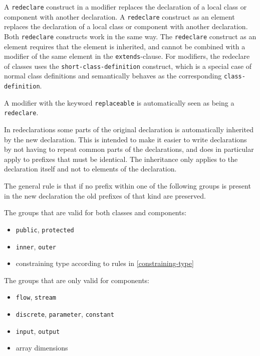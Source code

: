 A \lstinline!redeclare! construct in a modifier replaces the declaration of a local class or component with another declaration.
A \lstinline!redeclare! construct as an element replaces the declaration of a local class or component with another declaration.
Both \lstinline!redeclare! constructs work in the same way.
The \lstinline!redeclare! construct as an element requires that the element is inherited, and cannot be combined with a modifier of the same element in the \lstinline!extends!-clause.
For modifiers, the redeclare of classes uses the \lstinline[language=grammar]!short-class-definition! construct, which is a special case of normal class definitions and semantically behaves as the corresponding \lstinline[language=grammar]!class-definition!.

A modifier with the keyword \lstinline!replaceable! is automatically seen as being a \lstinline!redeclare!.

In redeclarations some parts of the original declaration is automatically inherited by the new declaration.
This is intended to make it easier to write declarations by not having to repeat common parts of the declarations, and does in particular apply to prefixes that must be identical.
The inheritance only applies to the declaration itself and not to elements of the declaration.

The general rule is that if no prefix within one of the following groups is present in the new declaration the old prefixes of that kind are preserved.

The groups that are valid for both classes and components:
\begin{itemize}
\item
  \lstinline!public!, \lstinline!protected!
\item
  \lstinline!inner!, \lstinline!outer!
\item
  constraining type according to rules in \cref{constraining-type}
\end{itemize}

The groups that are only valid for components:
\begin{itemize}
\item
  \lstinline!flow!, \lstinline!stream!
\item
  \lstinline!discrete!, \lstinline!parameter!, \lstinline!constant!
\item
  \lstinline!input!, \lstinline!output!
\item
  array dimensions
\end{itemize}

